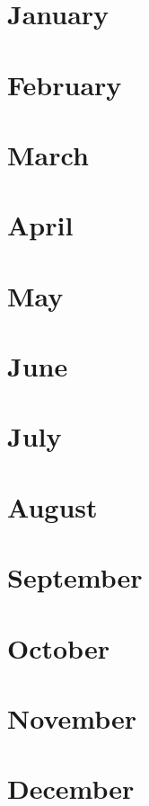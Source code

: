 \documentclass[extrafontsizes]{memoir}
\begin{document}
\pagestyle{empty} 
\mytitlepage

\newpage


\tableofcontents



\chapter{January}
%

\chapter{February}
%

\chapter{March}
%

\chapter{April}
%

\chapter{May}
%

\chapter{June}
%

\chapter{July}
%

\chapter{August}
%

\chapter{September}
%

\chapter{October}
%

\chapter{November}
%

\chapter{December}
%



%
%
\end{document}

